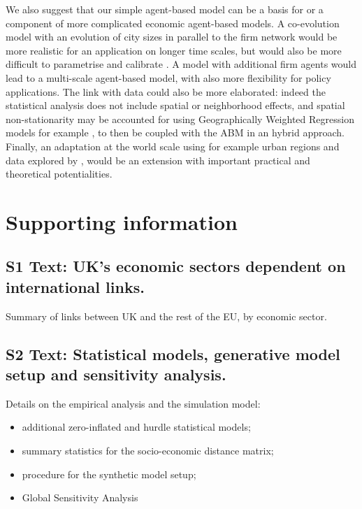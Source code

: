 \documentclass[10pt,letterpaper]{article}
\begin{document}
We also suggest that our simple agent-based model can be a basis for or a component of more complicated economic agent-based models. A co-evolution model with an evolution of city sizes in parallel to the firm network would be more realistic for an application on longer time scales, but would also be more difficult to parametrise and calibrate \cite{raimbault2018characterising}. A model with additional firm agents would lead to a multi-scale agent-based model, with also more flexibility for policy applications. The link with data could also be more elaborated: indeed the statistical analysis does not include spatial or neighborhood effects, and spatial non-stationarity may be accounted for using Geographically Weighted Regression models for example \cite{comber2021route}, to then be coupled with the ABM in an hybrid approach. Finally, an adaptation at the world scale using for example urban regions and data explored by \cite{rozenblat2021intra}, would be an extension with important practical and theoretical potentialities. 


\section*{Supporting information}

\subsection*{S1 Text: UK's economic sectors dependent on international links.}
\label{S1Text}

Summary of links between UK and the rest of the EU, by economic sector.

\subsection*{S2 Text: Statistical models, generative model setup and sensitivity analysis.}
\label{S2Text}

Details on the empirical analysis and the simulation model:

\begin{itemize}
    \item additional zero-inflated and hurdle statistical models;
    \item summary statistics for the socio-economic distance matrix;
    \item procedure for the synthetic model setup;
    \item Global Sensitivity Analysis
\end{itemize}
\end{document}
